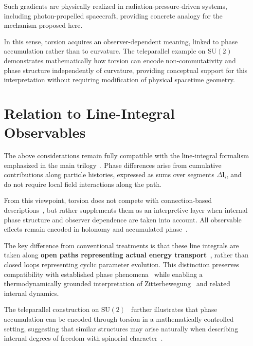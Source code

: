 \documentclass[12pt,letterpaper]{article}
\begin{document}
Such gradients are physically realized in radiation-pressure-driven systems, including photon-propelled spacecraft, providing concrete analogy for the mechanism proposed here.

In this sense, torsion acquires an observer-dependent meaning, linked to phase accumulation rather than to curvature. The teleparallel example on $\mathrm{SU}(2)$~\cite{Aldrovandi2013} demonstrates mathematically how torsion can encode non-commutativity and phase structure independently of curvature, providing conceptual support for this interpretation without requiring modification of physical spacetime geometry.


\section{Relation to Line-Integral Observables}

\justifying
The above considerations remain fully compatible with the line-integral formalism emphasized in the main trilogy~\cite{hanamura18067760,hanamura18135855,hanamura18203433}. Phase differences arise from cumulative contributions along particle histories, expressed as sums over segments $\Delta \mathbf{l}_i$, and do not require local field interactions along the path.

From this viewpoint, torsion does not compete with connection-based descriptions~\cite{hanamura18135855}, but rather supplements them as an interpretive layer when internal phase structure and observer dependence are taken into account. All observable effects remain encoded in holonomy and accumulated phase~\cite{hanamura18067760,hanamura18135855,hanamura18203433}.

The key difference from conventional treatments is that these line integrals are taken along \textbf{open paths representing actual energy transport}~\cite{hanamura18203433}, rather than closed loops representing cyclic parameter evolution. This distinction preserves compatibility with established phase phenomena~\cite{ABEffect,Berry1984,WilsonLoop} while enabling a thermodynamically grounded interpretation of Zitterbewegung~\cite{Schrodinger1930} and related internal dynamics.

The teleparallel construction on $\mathrm{SU}(2)$~\cite{Aldrovandi2013} further illustrates that phase accumulation can be encoded through torsion in a mathematically controlled setting, suggesting that similar structures may arise naturally when describing internal degrees of freedom with spinorial character~\cite{hanamura18067760}.
\end{document}
